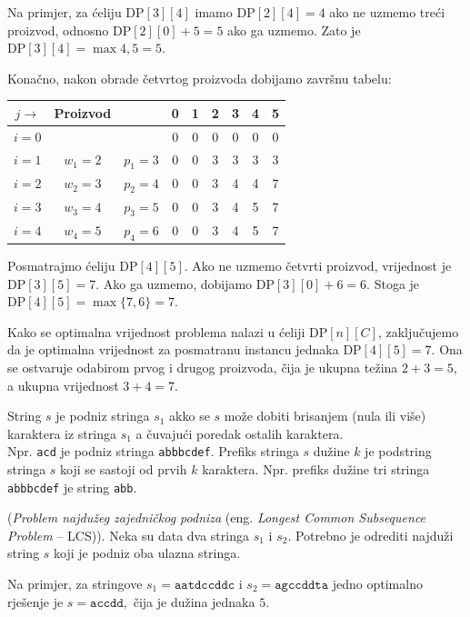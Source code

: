 Na primjer, za ćeliju $\textrm{DP}[3][4]$ imamo $\textrm{DP}[2][4]=4$ ako ne uzmemo treći proizvod, odnosno $\textrm{DP}[2][0]+5=5$ ako ga uzmemo. Zato je $\textrm{DP}[3][4]=\max{4,5}=5.$

\medskip

Konačno, nakon obrade četvrtog proizvoda dobijamo završnu tabelu:

\begin{table}[H]
	\centering
	\begin{tabular}{|c|cc|cccccc|}\hline
		$j\rightarrow$ & Proizvod & & 0 & 1 & 2 & 3 & 4 & 5 \\ \hline
		$i=0$ & & & 0 & 0 & 0 & 0 & 0 & 0 \\
		$i=1$ & $w_1=2$ & $p_1=3$ & 0 & 0 & 3 & 3 & 3 & 3 \\
		$i=2$ & $w_2=3$ & $p_2=4$ & 0 & 0 & 3 & 4 & 4 & 7 \\
		$i=3$ & $w_3=4$ & $p_3=5$ & 0 & 0 & 3 & 4 & 5 & 7 \\
		$i=4$ & $w_4=5$ & $p_4=6$ & 0 & 0 & 3 & 4 & 5 & 7 \\ \hline
	\end{tabular}
\end{table}

Posmatrajmo ćeliju $\textrm{DP}[4][5]$. Ako ne uzmemo četvrti proizvod, vrijednost je $ \textrm{DP}[3][5]=7.$ Ako ga uzmemo, dobijamo $\textrm{DP}[3][0]+6=6.$ Stoga je $ \textrm{DP}[4][5]=\max\{7,6\}=7.$

Kako se optimalna vrijednost problema nalazi u ćeliji $\textrm{DP}[n][C]$, zaključujemo da je optimalna vrijednost za posmatranu instancu jednaka $\textrm{DP}[4][5]=7.$  Ona se ostvaruje odabirom prvog i drugog proizvoda, čija je ukupna težina $2+3=5$, a ukupna vrijednost $3+4=7$.

 \begin{definition}
 	String $s$ je podniz stringa $s_1$ akko se $s$ može dobiti brisanjem (nula ili više)
 	karaktera iz stringa $s_1$ a čuvajući poredak ostalih karaktera. \\
 	Npr.  \texttt{acd} je podniz stringa \texttt{abbbcdef}.   Prefiks stringa $s$ dužine $k$ je podstring stringa $s$ koji se sastoji od prvih $k$ karaktera. Npr. prefiks dužine tri stringa \texttt{abbbcdef} je string \texttt{abb}. 
 	
 \end{definition}
 
\begin{example}
	(\textit{Problem najdužeg zajedničkog podniza} (eng. \emph{Longest Common Subsequence Problem} -- LCS)). Neka su data dva stringa $s_1$ i $s_2$. Potrebno je odrediti najduži string $s$ koji je podniz oba ulazna stringa.
	
	Na primjer, za stringove $s_1=\texttt{aatdccddc}$ i 
	$s_2=\texttt{agccddta} $
	jedno optimalno rješenje je $s=\texttt{accdd},$
	čija je dužina jednaka $5$.
\end{example}

